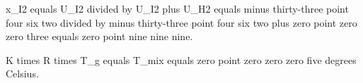 x_I2 equals U_I2 divided by U_I2 plus U_H2 equals minus thirty-three point four six two divided by minus thirty-three point four six two plus zero point zero zero three equals zero point nine nine nine.  

K times R times T_g equals T_mix equals zero point zero zero zero five degrees Celsius.